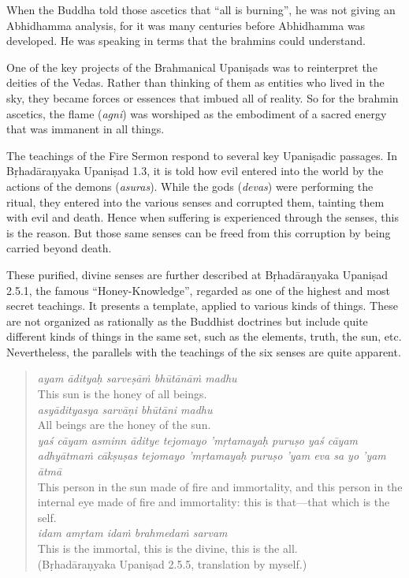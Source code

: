 \documentclass[12pt,openany]{book}%
\begin{document}
When the Buddha told those ascetics that “all is burning”, he was not giving an Abhidhamma analysis, for it was many centuries before Abhidhamma was developed. He was speaking in terms that the brahmins could understand.

One of the key projects of the Brahmanical \textsanskrit{Upaniṣads} was to reinterpret the deities of the Vedas. Rather than thinking of them as entities who lived in the sky, they became forces or essences that imbued all of reality. So for the brahmin ascetics, the flame (\textit{agni}) was worshiped as the embodiment of a sacred energy that was immanent in all things.

The teachings of the Fire Sermon respond to several key \textsanskrit{Upaniṣadic} passages. In \textsanskrit{Bṛhadāraṇyaka} \textsanskrit{Upaniṣad} 1.3, it is told how evil entered into the world by the actions of the demons (\textit{asuras}). While the gods (\textit{devas}) were performing the ritual, they entered into the various senses and corrupted them, tainting them with evil and death. Hence when suffering is experienced through the senses, this is the reason. But those same senses can be freed from this corruption by being carried beyond death.

These purified, divine senses are further described at \textsanskrit{Bṛhadāraṇyaka} \textsanskrit{Upaniṣad} 2.5.1, the famous “Honey-Knowledge”, regarded as one of the highest and most secret teachings. It presents a template, applied to various kinds of things. These are not organized as rationally as the Buddhist doctrines but include quite different kinds of things in the same set, such as the elements, truth, the sun, etc. Nevertheless, the parallels with the teachings of the six senses are quite apparent.

\begin{verse}%
\textit{ayam \textsanskrit{ādityaḥ} \textsanskrit{sarveṣāṁ} \textsanskrit{bhūtānāṁ} madhu} \\
This sun is the honey of all beings. \\
\textit{\textsanskrit{asyādityasya} \textsanskrit{sarvāṇi} \textsanskrit{bhūtāni} madhu} \\
All beings are the honey of the sun. \\
\textit{\textsanskrit{yaś} \textsanskrit{cāyam} asminn \textsanskrit{āditye} tejomayo ’\textsanskrit{mṛtamayaḥ} \textsanskrit{puruṣo} \textsanskrit{yaś} \textsanskrit{cāyam} \textsanskrit{adhyātmaṁ} \textsanskrit{cākṣuṣas} tejomayo ’\textsanskrit{mṛtamayaḥ} \textsanskrit{puruṣo} ’yam eva sa yo ’yam \textsanskrit{ātmā}} \\
This person in the sun made of fire and immortality, and this person in the internal eye made of fire and immortality: this is that—that which is the self. \\
\textit{idam \textsanskrit{amṛtam} \textsanskrit{idaṁ} \textsanskrit{brahmedaṁ} sarvam} \\
This is the immortal, this is the divine, this is the all. \\
(\textsanskrit{Bṛhadāraṇyaka} \textsanskrit{Upaniṣad} 2.5.5, translation by myself.)

%
\end{verse}
\end{document}
